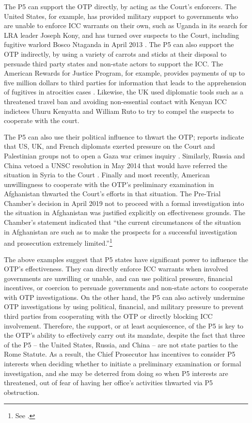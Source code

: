 The P5 can support the OTP directly, by acting as the Court's enforcers. The United States, for example, has provided military support to governments who are unable to enforce ICC warrants on their own, such as Uganda in its search for LRA leader Joseph Kony, and has turned over suspects to the Court, including fugitive warlord Bosco Ntaganda in April 2013 \citep{simons_2013}. The P5 can also support the OTP indirectly, by using a variety of carrots and sticks at their disposal to persuade third party states and non-state actors to support the ICC. The American Rewards for Justice Program, for example, provides payments of up to five million dollars to third parties for information that leads to the apprehension of fugitives in atrocities cases \citep{simons_2013}. Likewise, the UK used diplomatic tools such as a threatened travel ban and avoiding non-essential contact with Kenyan ICC indictees Uhuru Kenyatta and William Ruto to try to compel the suspects to cooperate with the court\citep{smith_2013}.

The P5 can also use their political influence to thwart the OTP; reports indicate that US, UK, and French diplomats exerted pressure on the Court and Palestinian groups not to open a Gaza war crimes inquiry \citep{borger_2014, jerusalem_post_2014}. Similarly, Russia and China vetoed a UNSC resolution in May 2014 that would have referred the situation in Syria to the Court \citep{bbc_2014}. Finally and most recently, American unwillingness to cooperate with the OTP's preliminary examination in Afghanistan thwarted the Court's efforts in that situation. The Pre-Trial Chamber's decision in April 2019 not to proceed with a formal investigation into the situation in Afghanistan was justified explicitly on effectiveness grounds. The Chamber's statement indicated that ``the current circumstances of the situation in Afghanistan are such as to make the prospects for a successful investigation and prosecution extremely limited.''\footnote{See \citep{Kennedy_19}.}

The above examples suggest that P5 states have significant power to influence the OTP's effectiveness. They can directly enforce ICC warrants when involved governments are unwilling or unable, and can use political pressure, financial incentives, or coercion to persuade governments and non-state actors to cooperate with OTP investigations. On the other hand, the P5 can also actively undermine OTP investigations by using political, financial, and military pressure to prevent third parties from cooperating with the OTP or directly blocking ICC involvement. Therefore, the support, or at least acquiescence, of the P5 is key to the OTP's ability to effectively carry out its mandate, despite the fact that three of the P5 -- the United States, Russia, and China -- are not state parties to the Rome Statute. As a result, the Chief Prosecutor has incentives to consider P5 interests when deciding whether to initiate a preliminary examination or formal investigation, and she may be deterred from doing so when P5 interests are threatened, out of fear of having her office's activities thwarted via P5 obstruction.

